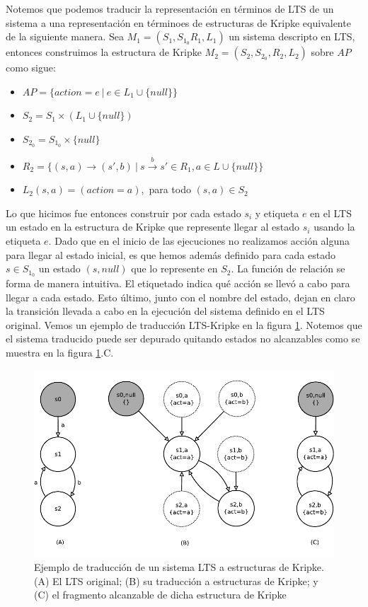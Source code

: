 \documentclass[titlepage, 12pt]{book}
\begin{document}
Notemos que podemos traducir la representaci\'on en t\'erminos de LTS de un sistema a una representaci\'on en t\'erminoes de estructuras de Kripke equivalente de la siguiente manera. Sea $M_1 = (S_1, S_{1_0} R_1, L_1)$ un sistema descripto en LTS, entonces construimos la estructura de Kripke $M_2 = (S_2,S_{2_0},R_2,L_2)$ sobre $AP$ como sigue:
\begin{itemize}
\item $ AP = \{action = e ~|~ e \in L_1 \cup \{null\}\} $
\item $ S_2 = S_1 \times (L_1 \cup \{null\}) $
\item $S_{2_0} = S_{1_0} \times \{null\}$
\item $R_2 = \{(s,a) \rightarrow (s',b) ~|~ s\overset{b}{\rightarrow}s' \in R_1, a \in L \cup \{null\}\}$
\item $L_2(s,a) = (action = a),$ para todo $(s,a) \in S_2$
\end{itemize}
Lo que hicimos fue entonces construir por cada estado $s_i$ y etiqueta $e$ en el LTS un estado en la estructura de Kripke que represente llegar al estado $s_i$ usando la etiqueta $e$. Dado que en el inicio de las ejecuciones no realizamos acci\'on alguna para llegar al estado inicial, es que hemos adem\'as definido para cada estado $s \in S_{1_0}$ un estado $(s,null)$ que lo represente en $S_2$. La funci\'on de relaci\'on se forma de manera intuitiva. El etiquetado indica qu\'e acci\'on se llev\'o a cabo para llegar a cada estado. Esto \'ultimo, junto con el nombre del estado, dejan en claro la transici\'on llevada a cabo en la ejecuci\'on del sistema definido en el LTS original. Vemos un ejemplo de traducci\'on LTS-Kripke en la figura \ref{ltsakripke}. Notemos que el sistema traducido puede ser depurado quitando estados no alcanzables como se muestra en la figura \ref{ltsakripke}.C.

\begin{figure}[htp]
  \centering
    \includegraphics{Imagenes/ltsakripke.pdf}
  \caption{Ejemplo de traducci\'on de un sistema LTS a estructuras de Kripke. (A) El LTS original; (B) su traducci\'on a estructuras de Kripke; y (C) el fragmento alcanzable de dicha estructura de Kripke}
  \label{ltsakripke}
\end{figure}
\end{document}
